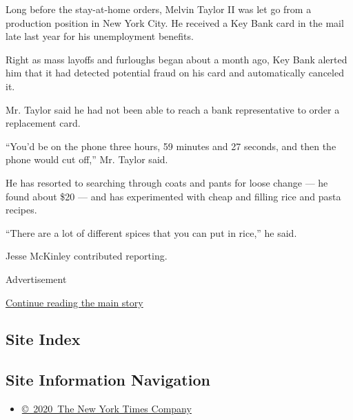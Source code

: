 Long before the stay-at-home orders, Melvin Taylor II was let go from a
production position in New York City. He received a Key Bank card in the
mail late last year for his unemployment benefits.

Right as mass layoffs and furloughs began about a month ago, Key Bank
alerted him that it had detected potential fraud on his card and
automatically canceled it.

Mr. Taylor said he had not been able to reach a bank representative to
order a replacement card.

``You'd be on the phone three hours, 59 minutes and 27 seconds, and then
the phone would cut off,'' Mr. Taylor said.

He has resorted to searching through coats and pants for loose change
--- he found about \$20 --- and has experimented with cheap and filling
rice and pasta recipes.

``There are a lot of different spices that you can put in rice,'' he
said.

Jesse McKinley contributed reporting.

Advertisement

\protect\hyperlink{after-bottom}{Continue reading the main story}

\hypertarget{site-index}{%
\subsection{Site Index}\label{site-index}}

\hypertarget{site-information-navigation}{%
\subsection{Site Information
Navigation}\label{site-information-navigation}}

\begin{itemize}
\tightlist
\item
  \href{https://help.nytimes.com/hc/en-us/articles/115014792127-Copyright-notice}{©~2020~The
  New York Times Company}
\end{itemize}

